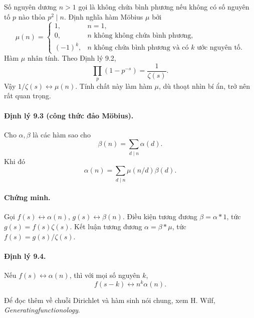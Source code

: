 \documentclass[11pt]{article}
\begin{document}
Số nguyên dương \(n>1\) gọi là không chứa bình phương nếu không có số nguyên
tố \(p\) nào thỏa \(p^2\mid n\). Định nghĩa hàm Möbius \(\mu\) bởi
\[
\mu(n)=
\begin{cases}
1,&n=1,\\
0,&n\text{ không không chứa bình phương},\\
(-1)^k,&n\text{ không chứa bình phương và có }k\text{ ước nguyên tố}.
\end{cases}
\]
Hàm \(\mu\) nhân tính. Theo Định lý 9.2,
\[
 \prod_p(1-p^{-s})=\frac1{\zeta(s)}.
\]
Vậy \(1/\zeta(s)\leftrightarrow\mu(n)\). Tính chất này làm hàm \(\mu\), dù
thoạt nhìn bí ẩn, trở nên rất quan trọng.

\paragraph{Định lý 9.3 (công thức đảo Möbius).}
Cho \(\alpha,\beta\) là các hàm sao cho
\[
 \beta(n)=\sum_{d\mid n}\alpha(d).
\]
Khi đó
\[
 \alpha(n)=\sum_{d\mid n}\mu(n/d)\beta(d).
\]

\paragraph{Chứng minh.}
Gọi \(f(s)\leftrightarrow\alpha(n)\), \(g(s)\leftrightarrow\beta(n)\). Điều
kiện tương đương \(\beta=\alpha*1\), tức \(g(s)=f(s)\zeta(s)\). Kết luận tương
đương \(\alpha=\beta*\mu\), tức \(f(s)=g(s)/\zeta(s)\).

\paragraph{Định lý 9.4.}
Nếu \(f(s)\leftrightarrow\alpha(n)\), thì với mọi số nguyên \(k\),
\[
 f(s-k)\leftrightarrow n^k\alpha(n).
\]

Để đọc thêm về chuỗi Dirichlet và hàm sinh nói chung, xem H. Wilf,
\textit{Generatingfunctionology}.
\end{document}
